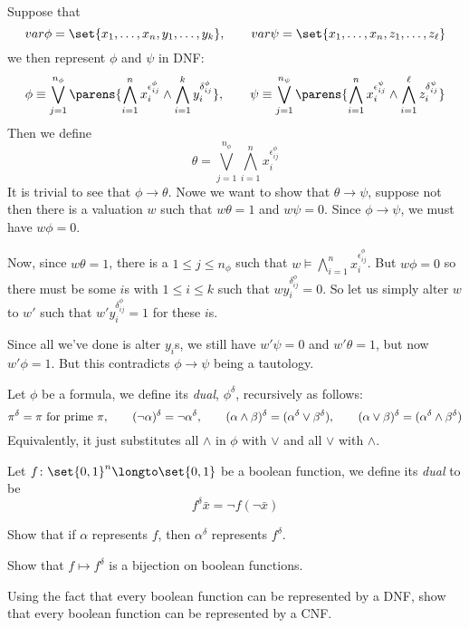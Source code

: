 \eprob

Suppose that
$$ \var\phi = \set{x_1,\dots,x_n,y_1,\dots,y_k},\qquad \var\psi = \set{x_1,\dots,x_n,z_1,\dots,z_\ell} $$
we then represent $\phi$ and $\psi$ in DNF:
$$
\phi \equiv \bigvee_{j=1}^{n_\phi}\parens{\bigwedge_{i=1}^nx_i^{\epsilon^\phi_{ij}}\wedge\bigwedge_{i=1}^ky_i^{\delta^\phi_{ij}}},\qquad
\psi \equiv \bigvee_{j=1}^{n_\psi}\parens{\bigwedge_{i=1}^nx_i^{\epsilon^\psi_{ij}}\wedge\bigwedge_{i=1}^\ell z_i^{\delta^\psi_{ij}}}
$$
Then we define
$$ \theta = \bigvee_{j=1}^{n_\phi}\bigwedge_{i=1}^nx_i^{\epsilon^\phi_{ij}} $$
It is trivial to see that $\phi\to\theta$.
Nowe we want to show that $\theta\to\psi$, suppose not then there is a valuation $w$ such that $w\theta=1$ and $w\psi=0$.
Since $\phi\to\psi$, we must have $w\phi=0$.

Now, since $w\theta=1$, there is a $1\leq j\leq n_\phi$ such that $w\vDash\bigwedge_{i=1}^nx_i^{\epsilon^\phi_{ij}}$.
But $w\phi=0$ so there must be some $i$s with $1\leq i\leq k$ such that $wy_i^{\delta^\phi_{ij}}=0$.
So let us simply alter $w$ to $w'$ such that $w'y_i^{\delta^\phi_{ij}}=1$ for these $i$s.

Since all we've done is alter $y_i$s, we still have $w'\psi=0$ and $w'\theta=1$, but now $w'\phi=1$.
But this contradicts $\phi\to\psi$ being a tautology.

\bprob

    Let $\phi$ be a formula, we define its {\it dual}, $\phi^\delta$, recursively as follows:
    $$ \pi^\delta = \pi \hbox{ for prime $\pi$},\qquad (\neg\alpha)^\delta=\neg\alpha^\delta,
    \qquad (\alpha\land\beta)^\delta = (\alpha^\delta\lor\beta^\delta),\qquad
    (\alpha\lor\beta)^\delta = (\alpha^\delta\land\beta^\delta) $$
    Equivalently, it just substitutes all $\land$ in $\phi$ with $\lor$ and all $\lor$ with
    $\land$.

    Let $f\colon\set{0,1}^n\longto\set{0,1}$ be a boolean function, we define its {\it dual} to be
    $$ f^\delta\bar x = \neg f(\neg\bar x) $$

    \benum
        \item Show that if $\alpha$ represents $f$, then $\alpha^\delta$ represents $f^\delta$.
        \item Show that $f\mapsto f^\delta$ is a bijection on boolean functions.
        \item Using the fact that every boolean function can be represented by a DNF, show that
        every boolean function can be represented by a CNF.
    \eenum

